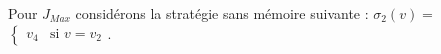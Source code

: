 \begin{exemple}
\noindent Pour $J_{Max}$ considérons la stratégie sans mémoire suivante : 																					$\sigma _{2}(v) = $ $\begin{cases}
					v_{4} & \text{si } v = v_{2}
																																										
																																										\end{cases}$.\\
																																										
						
\end{exemple}